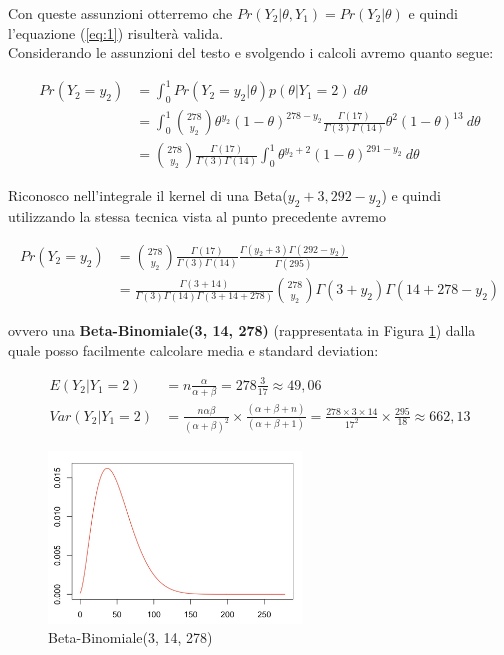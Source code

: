 Con queste assunzioni otterremo che $Pr(Y_2|\theta,Y_1) = Pr(Y_2|\theta)$ e quindi l'equazione (\ref{eq:1}) risulterà valida. \\
Considerando le assunzioni del testo e svolgendo i calcoli avremo quanto segue:

\begin{align*}
     Pr(Y_2=y_2) &= \int_0^1 Pr(Y_2=y_2|\theta)p(\theta|Y_1=2) \ d\theta\\
     &= \int_0^1 \binom{278}{y_2}\theta^{y_2}(1-\theta)^{278-y_2} \frac{\Gamma(17)}{\Gamma(3)\Gamma(14)} \theta^2(1-\theta)^{13}\ d\theta\\
      &= \binom{278}{y_2} \frac{\Gamma(17)}{\Gamma(3)\Gamma(14)} \int_0^1 \theta^{y_2 + 2}(1-\theta)^{291-y_2}\ d\theta
\end{align*}

Riconosco nell'integrale il kernel di una Beta($y_2+3,292-y_2$) e quindi utilizzando la stessa tecnica vista al punto precedente avremo

\begin{align*}
     Pr(Y_2=y_2) &= \binom{278}{y_2} \frac{\Gamma(17)}{\Gamma(3)\Gamma(14)} \frac{\Gamma(y_2+3)\Gamma(292-y_2)}{\Gamma(295)}\\
     &=  \frac{\Gamma(3+14)}{\Gamma(3)\Gamma(14)\Gamma(3+14+278)}\binom{278}{y_2} \Gamma(3+y_2)\Gamma(14+278-y_2)
\end{align*}

ovvero una \textbf{Beta-Binomiale(3, 14, 278)} (rappresentata in Figura \ref{fig:betaBinomiale}) dalla quale posso facilmente calcolare media e standard deviation:

\begin{align*}
    E(Y_2|Y_1=2) &= n\frac{\alpha}{\alpha + \beta} = 278\frac{3}{17} \approx 49,06\\
    Var(Y_2|Y_1=2) &= \frac{n\alpha\beta}{(\alpha + \beta)^2}\times\frac{(\alpha + \beta + n)}{(\alpha + \beta + 1)} = \frac{278\times3\times14}{17^2} \times\frac{295}{18} \approx 662,13
\end{align*}


\begin{figure}[!ht]
\centering
\includegraphics[width=0.6\textwidth]{img/esercizio3-07-BetaBinomiale}
\caption{Beta-Binomiale(3, 14, 278)}
\label{fig:betaBinomiale}
\end{figure}

